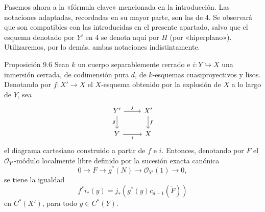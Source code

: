 Pasemos ahora a la «fórmula clave» mencionada en la introducción. Las notaciones adaptadas, recordadas en su mayor parte, son las de 4. Se observará que son compatibles con las introducidas en el presente apartado, salvo que el esquema denotado por $Y'$ en 4 se denota aquí por $H$ (por «hiperplano»). Utilizaremos, por lo demás, ambas notaciones indistintamente.

\begin{statement}{Proposición 9.6}
Sean $k$ un cuerpo separablemente cerrado e $i:Y\hookrightarrow X$ una inmersión cerrada, de codimensión pura $d$, de $k$-esquemas cuasiproyectivos y lisos. Denotando por $f:X'\to X$ el $X$-esquema obtenido por la explosión de $X$ a lo largo de $Y$, sea
\[
\begin{tikzcd}
Y'\arrow[r,"j"]\arrow[d,"g"']&X'\arrow[d,"f"]\\
Y\arrow[r,"i"']&X
\end{tikzcd}
\]
el diagrama cartesiano construido a partir de $f$ e $i$. Entonces, denotando por $F$ el $\mathcal O_{Y'}$-módulo localmente libre definido por la sucesión exacta canónica
\[
0\to F\to g^*(N)\to\mathcal O_{Y'}(1)\to0,
\tag{9.6.1}
\]
se tiene la igualdad
\[
f^*i_*(y)=j_*(g^*(y)c_{d-1}(\check F))
\tag{9.6.2}
\]
en $C^*(X')$, para todo $y\in C^*(Y)$.
\end{statement}
